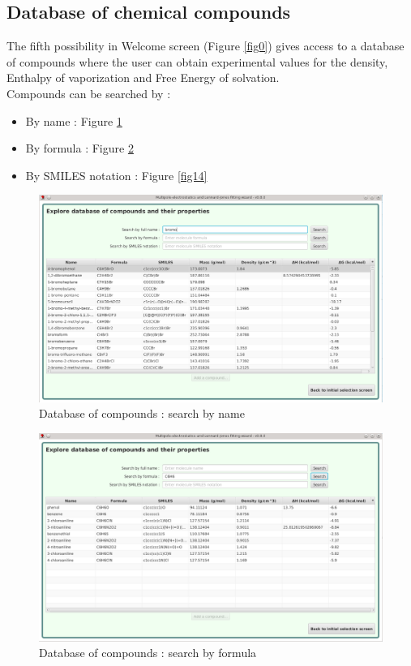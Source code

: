 \documentclass[12pt,a4paper]{article}
\begin{document}
\subsection{Database of chemical compounds}

The fifth possibility in Welcome screen (Figure \ref{fig0}) gives access to a database of 
compounds where the user can obtain experimental values for the density, Enthalpy of vaporization 
and Free Energy of solvation.\\

Compounds can be searched by : 

\begin{itemize}
\item By name : Figure \ref{fig12}
\item By formula : Figure \ref{fig13}
\item By SMILES notation : Figure \ref{fig14}
\end{itemize}

\begin{figure}[h!]
\centering
\includegraphics[width=0.9\linewidth]{pics/scr12}
\caption{Database of compounds : search by name}
\label{fig12}
\end{figure}

\begin{figure}[h!]
\centering
\includegraphics[width=0.9\linewidth]{pics/scr13}
\caption{Database of compounds : search by formula}
\label{fig13}
\end{figure}
\end{document}
